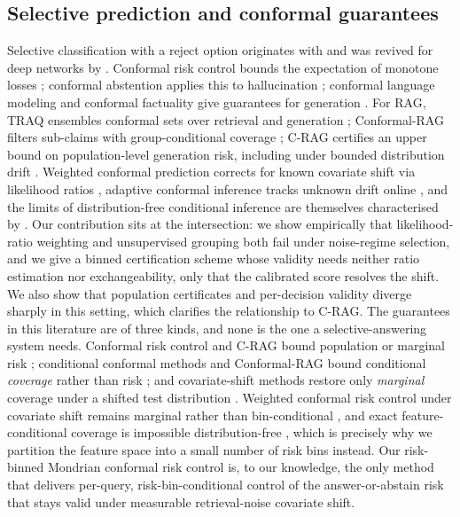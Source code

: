 \documentclass[11pt]{article}
\begin{document}
\subsection{Selective prediction and conformal guarantees}
Selective classification with a reject option originates with
\citet{chow1970} and was revived for deep networks by
\citet{geifman2017selective}. Conformal risk control bounds the
expectation of monotone losses \citep{angelopoulos2024crc}; conformal
abstention applies this to hallucination
\citep{abbasi2024conformalabstention}; conformal language modeling and
conformal factuality give guarantees for generation
\citep{quach2024conformal,mohri2024factuality}. For RAG, TRAQ ensembles
conformal sets over retrieval and generation \citep{li2024traq};
Conformal-RAG filters sub-claims with group-conditional coverage
\citep{feng2025conformalrag}; C-RAG certifies an upper bound on
population-level generation risk, including under bounded distribution
drift \citep{kang2024crag}. Weighted conformal prediction corrects for
known covariate shift via likelihood ratios
\citep{tibshirani2019covariate}, adaptive conformal inference tracks
unknown drift online \citep{gibbs2021aci}, and the limits of
distribution-free conditional inference are themselves characterised by
\citet{barber2021limits}.
Our contribution sits at the intersection: we show empirically that
likelihood-ratio weighting and unsupervised grouping both fail under
noise-regime selection, and we give a binned certification scheme whose
validity needs neither ratio estimation nor exchangeability, only that
the calibrated score resolves the shift. We also show that population
certificates and per-decision validity diverge sharply in this setting,
which clarifies the relationship to C-RAG.
The guarantees in this literature are of three kinds, and none is the
one a selective-answering system needs. Conformal risk control and C-RAG
bound population or marginal risk
\citep{angelopoulos2024crc,kang2024crag}; conditional conformal methods
and Conformal-RAG bound conditional \emph{coverage} rather than risk
\citep{gibbs2025conditional,feng2025conformalrag}; and covariate-shift
methods restore only \emph{marginal} coverage under a shifted test
distribution \citep{tibshirani2019covariate,gibbs2021aci}. Weighted
conformal risk control under covariate shift remains marginal rather than
bin-conditional \citep{zecchin2025wcrc}, and exact feature-conditional
coverage is impossible distribution-free \citep{barber2021limits}, which
is precisely why we partition the feature space into a small number of
risk bins instead. Our risk-binned Mondrian conformal risk control is, to
our knowledge, the only method that delivers per-query, risk-bin-conditional
control of the answer-or-abstain risk that stays valid under measurable
retrieval-noise covariate shift.
\end{document}

